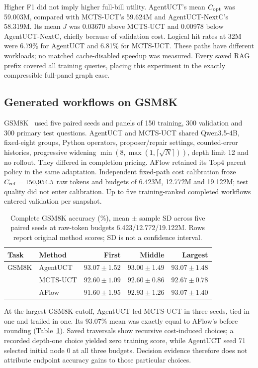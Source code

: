 Higher F1 did not imply higher full-bill utility. AgentUCT's mean
$C_{\rm opt}$ was 59.003M, compared with MCTS-UCT's 59.624M and
AgentUCT-NextC's 58.319M. Its mean $J$ was 0.03670 above MCTS-UCT and
0.00978 below AgentUCT-NextC, chiefly because of validation cost.
Logical hit rates at 32M were 6.79\% for AgentUCT and 6.81\% for MCTS-UCT.
These paths have different workloads; no matched cache-disabled speedup was
measured. Every saved RAG prefix covered all training queries, placing this
experiment in the exactly compressible full-panel graph case.

\subsection{Generated workflows on GSM8K}
GSM8K~\citep{cobbe2021verifiers} used five paired seeds and panels of 150 training, 300 validation and
300 primary test questions. AgentUCT and MCTS-UCT shared Qwen3.5-4B,
fixed-eight groups, Python operators, proposer/repair settings, counted-error
histories, progressive widening $\min(8,\max(1,\lceil\sqrt N\rceil))$, depth limit
12 and no rollout. They differed in completion pricing. AFlow retained its
Top4 parent policy in the same adaptation. Independent fixed-path cost
calibration froze $C_{\rm ref}=150{,}954.5$ raw tokens and budgets of
6.423M, 12.772M and 19.122M; test quality did not enter calibration.
Up to five training-ranked completed workflows entered validation per snapshot.

\begin{table}[t]
\centering\small
\caption{Complete GSM8K accuracy (\%), mean $\pm$ sample SD across five
paired seeds at raw-token budgets 6.423/12.772/19.122M. Rows report original
method scores; SD is not a confidence interval.}
\label{tab:generated-complete-main}
\begin{tabular}{llrrr}
\toprule
Task & Method & First & Middle & Largest\\
\midrule
GSM8K & AgentUCT & $93.07\pm1.52$ & $93.00\pm1.49$ & $93.07\pm1.48$\\
 & MCTS-UCT & $92.60\pm1.09$ & $92.60\pm0.86$ & $92.67\pm0.78$\\
 & AFlow & $91.60\pm1.95$ & $92.93\pm1.26$ & $93.07\pm1.40$\\
\bottomrule
\end{tabular}
\end{table}

At the largest GSM8K cutoff, AgentUCT led MCTS-UCT in three seeds, tied
in one and trailed in one. Its $93.07\%$ mean was exactly equal to AFlow's
before rounding (Table~\ref{tab:generated-complete-main}). Saved traversals
show recursive cost-induced choices; a recorded depth-one choice yielded
zero training score, while AgentUCT seed 71 selected initial node 0 at all
three budgets. Decision evidence therefore does not attribute endpoint
accuracy gains to those particular choices.


